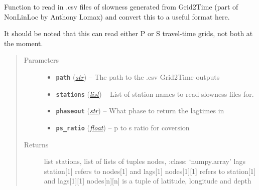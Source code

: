\documentclass[a4paper,10pt,english]{sphinxmanual}
\begin{document}
\begin{fulllineitems}
\label{core:bright_lights._read_tt}
Function to read in .csv files of slowness generated from Grid2Time (part
of NonLinLoc by Anthony Lomax) and convert this to a useful format here.

It should be noted that this can read either P or S travel-time grids, not
both at the moment.
\begin{quote}\begin{description}
\item[{Parameters}] \leavevmode\begin{itemize}
\item {} 
\textbf{\texttt{path}} (\href{https://docs.python.org/library/functions.html\#str}{\emph{str}}) -- The path to the .csv Grid2Time outputs

\item {} 
\textbf{\texttt{stations}} (\href{https://docs.python.org/library/functions.html\#list}{\emph{list}}) -- List of station names to read slowness files for.

\item {} 
\textbf{\texttt{phaseout}} (\href{https://docs.python.org/library/functions.html\#str}{\emph{str}}) -- What phase to return the lagtimes in

\item {} 
\textbf{\texttt{ps\_ratio}} (\href{https://docs.python.org/library/functions.html\#float}{\emph{float}}) -- p to s ratio for coversion

\end{itemize}

\item[{Returns}] \leavevmode
list stations, list of lists of tuples nodes,     :class: `numpy.array' lags station{[}1{]} refers to nodes{[}1{]} and     lags{[}1{]} nodes{[}1{]}{[}1{]} refers to station{[}1{]} and lags{[}1{]}{[}1{]}    nodes{[}n{]}{[}n{]} is a tuple of latitude, longitude and depth

\end{description}\end{quote}

\end{fulllineitems}

\end{document}
